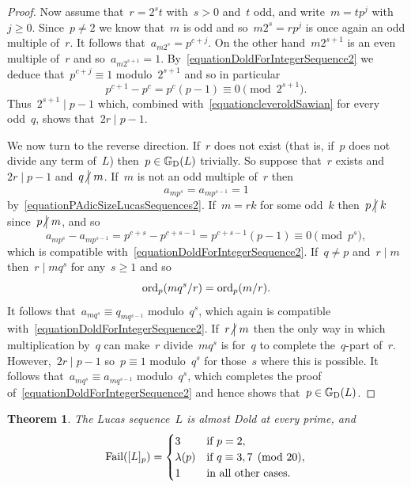\documentclass[]{interact}
\theoremstyle{plain}
\numberwithin{equation}{section} %
\newtheorem{theorem}[thm]{Theorem}
\numberwithin{table}{section} %
\numberwithin{figure}{section}
\def\gooddoldprimes{\mathbb{G}_{\rm{D}}}
\newcommand\ord{{\rm{ord}}}
\newcommand\failure{{\rm{Fail}}}
\newcommand\notdivides{\mathrel{\kern-3pt\not\!\kern4.3pt\bigm|}}
\newcommand\divides\mid
\def\ge{\geqslant}
\begin{document}
\begin{proof}
Now assume that~$r=2^st$ with~$s>0$ and~$t$ odd,
and write~$m=tp^j$ with~$j\ge0$. Since~$p\neq2$
we know that~$m$ is odd and so~$m2^s=rp^j$ is
once again an odd multiple of~$r$.
It follows that~$a_{m2^s}=p^{c+j}$.
On the other hand~$m2^{s+1}$ is an even multiple
of~$r$ and so~$a_{m2^{s+1}}=1$. By~\eqref{equationDoldForIntegerSequence2}
we deduce that~$p^{c+j}\equiv1$ modulo~$2^{s+1}$
and so in particular
\[
p^{c+1}-p^c=p^c(p-1)\equiv0\pmod{2^{s+1}}.
\]
Thus~$2^{s+1}\divides p-1$ which, combined
with~\eqref{equationcleveroldSawian} for every odd~$q$,
shows that~$2r\divides p-1$.

We now turn to the reverse direction.
If~$r$ does not exist (that is, if~$p$ does not divide
any term of~$L$) then~$p\in\gooddoldprimes(L)$
trivially. So suppose that~$r$ exists and~$2r\divides p-1$
and~$q\notdivides m$.
If~$m$ is not an odd multiple of~$r$ then
\[
a_{mp^s}=a_{mp^{s-1}}=1
\]
by~\eqref{equationPAdicSizeLucasSequences2}.
If~$m=rk$ for some odd~$k$ then~$p\notdivides k$ since~$p\notdivides m$,
and so
\[
a_{mp^s}-a_{mp^{s-1}}=p^{c+s}-p^{c+s-1}=p^{c+s-1}(p-1)\equiv0\pmod{p^s},
\]
which is compatible
with~\eqref{equationDoldForIntegerSequence2}.
If~$q\neq p$ and~$r\divides m$ then~$r\divides mq^s$ for any~$s\ge1$
and so
\[
\ord_{p}(mq^s/r)=\ord_p(m/r).
\]
It follows that~$a_{mq^s}\equiv q_{mq^{s-1}}$ modulo~$q^s$,
which again is compatible with~\eqref{equationDoldForIntegerSequence2}.
If~$r\notdivides m$ then the only way in which multiplication
by~$q$ can make~$r$ divide~$mq^s$ is for~$q$ to complete
the~$q$-part of~$r$. However,~$2r\divides p-1$ so~$p\equiv1$
modulo~$q^s$ for those~$s$ where this is possible.
It follows that~$a_{mq^s}\equiv a_{mq^{s-1}}$ modulo~$q^s$,
which completes the proof of~\eqref{equationDoldForIntegerSequence2}
and hence shows that~$p\in\gooddoldprimes(L)$.
\end{proof}


\begin{theorem}\label{theoremLucas}
The Lucas sequence~$L$ is almost Dold at every
prime, and
\[
\failure([L]_p)
=
\begin{cases}
3&\mbox{if }p=2,\\
\lambda(p)&\mbox{if }q\equiv3,7\pmod{20},\\
1&\mbox{in all other cases}.
\end{cases}
\]
\end{theorem}
\end{document}
